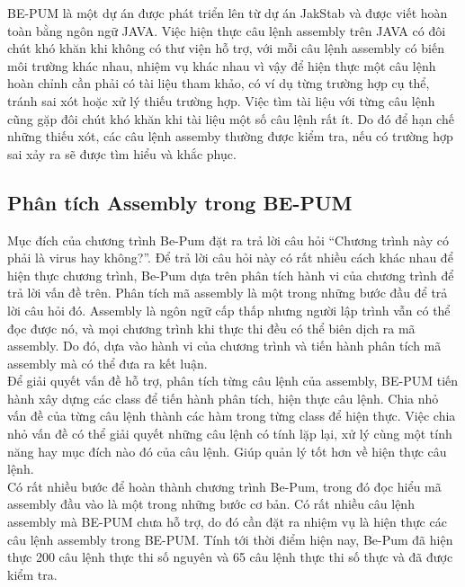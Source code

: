 BE-PUM là một dự án được phát triển lên từ dự án JakStab và được viết hoàn toàn bằng ngôn ngữ JAVA. Việc hiện thực câu lệnh assembly trên JAVA có đôi chút khó khăn khi không có thư viện hỗ trợ, với mỗi câu lệnh assembly có biến môi trường khác nhau, nhiệm vụ khác nhau vì vậy để hiện thực một câu lệnh hoàn chỉnh cần phải có tài liệu tham khảo, có ví dụ từng trường hợp cụ thể, tránh sai xót hoặc xử lý thiếu trường hợp. Việc tìm tài liệu với từng câu lệnh cũng gặp đôi chút khó khăn khi tài liệu một số câu lệnh rất ít. Do đó để hạn chế những thiếu xót, các câu lệnh assemby thường được kiểm tra, nếu có trường hợp sai xảy ra sẽ được tìm hiểu và khắc phục.

  \subsection{Phân tích Assembly trong BE-PUM}
  Mục đích của chương trình Be-Pum đặt ra trả lời câu hỏi “Chương trình này có phải là virus hay không?”. Để trả lời câu hỏi này có rất nhiều cách khác nhau để hiện thực chương trình, Be-Pum dựa trên phân tích hành vi của chương trình để trả lời vấn đề trên. Phân tích mã assembly là một trong những bước đầu để trả lời câu hỏi đó. Assembly là ngôn ngữ cấp thấp nhưng người lập trình vẫn có thể đọc được nó, và mọi chương trình khi thực thi đều có thể biên dịch ra mã assembly. Do đó, dựa vào hành vi của chương trình và tiến hành phân tích mã assembly mà có thể đưa ra kết luận.\\

Để giải quyết vấn đề hỗ trợ, phân tích từng câu lệnh của assembly, BE-PUM tiến hành xây dựng các class để tiến hành phân tích, hiện thực câu lệnh. Chia nhỏ vấn đề của từng câu lệnh thành các hàm trong từng class để hiện thực. Việc chia nhỏ vấn đề có thể giải quyết những câu lệnh có tính lặp lại, xử lý cùng một tính năng hay mục đích nào đó của câu lệnh. Giúp quản lý tốt hơn về hiện thực câu lệnh.\\

Có rất nhiều bước để hoàn thành chương trình Be-Pum, trong đó đọc hiểu mã assembly đầu vào là một trong những bước cơ bản. Có rất nhiều câu lệnh assembly mà BE-PUM chưa hỗ trợ, do đó cần đặt ra nhiệm vụ là hiện thực các câu lệnh assembly trong BE-PUM. Tính tới thời điểm hiện nay, Be-Pum đã hiện thực 200 câu lệnh thực thi số nguyên và 65 câu lệnh thực thi số thực và đã được kiểm tra. 


